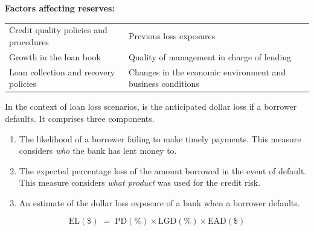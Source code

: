 \textbf{Factors affecting reserves:}

\begin{center}
\footnotesize
\begin{tabular}{L{7.2cm} L{7.2cm}}
\toprule
Credit quality policies and procedures & Previous loss exposures \\
Growth in the loan book & Quality of management in charge of lending \\
Loan collection and recovery policies & Changes in the economic environment and
business conditions \\
\bottomrule
\end{tabular}
\end{center}


In the context of loan loss scenarios,  is the
anticipated dollar loss if a borrower defaults. It comprises three components.

\begin{enumerate}
\item {} The likelihood of a borrower failing to
make timely payments. This measure considers \emph{who} the bank has lent money
to.
\item {} The expected percentage loss of the amount
borrowed in the event of default. This measure considers \emph{what product} was
used for the credit risk.
\item {} An estimate of the dollar loss exposure
of a bank when a borrower defaults.
\end{enumerate}

\begin{crfmlbox}
\[ \mathrm{EL}(\$) \;=\; \mathrm{PD}(\%) \times \mathrm{LGD}(\%) \times \mathrm{EAD}(\$) \]
\end{crfmlbox}

